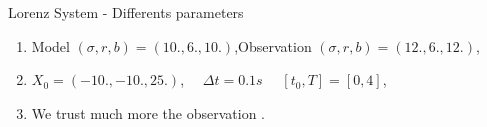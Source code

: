 \begin{frame}[allowframebreaks]{Lorenz System - Differents parameters}
       \begin{enumerate}[\textbullet]
                \item Model $(\sigma, r, b)=(10.,6.,10.)$,Observation $(\sigma, r, b)=(12.,6.,12.)$,
               \item $X_0=(-10.,-10.,25.)$, $\quad \Delta t=0.1s$ $\quad [t_0,T]=[0,4]$,
               \item We trust much more the observation .
            \end{enumerate}
   
       \begin{figure}
           \centering
       \end{figure}
   \end{frame}
       